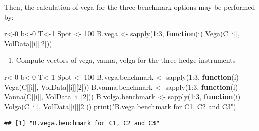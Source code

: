 \documentclass[
]{article}
\newenvironment{Shaded}{\begin{snugshade}}{\end{snugshade}}
\newcommand{\ControlFlowTok}[1]{\textcolor[rgb]{0.13,0.29,0.53}{\textbf{#1}}}
\newcommand{\DecValTok}[1]{\textcolor[rgb]{0.00,0.00,0.81}{#1}}
\newcommand{\FunctionTok}[1]{\textcolor[rgb]{0.00,0.00,0.00}{#1}}
\newcommand{\NormalTok}[1]{#1}
\newcommand{\OtherTok}[1]{\textcolor[rgb]{0.56,0.35,0.01}{#1}}
\newcommand{\SpecialCharTok}[1]{\textcolor[rgb]{0.00,0.00,0.00}{#1}}
\newcommand{\StringTok}[1]{\textcolor[rgb]{0.31,0.60,0.02}{#1}}
\providecommand{\tightlist}{%
  \setlength{\itemsep}{0pt}\setlength{\parskip}{0pt}}
\begin{document}
Then, the calculation of vega for the three benchmark options may be
performed by:

\begin{Shaded}
\begin{Highlighting}[]
\NormalTok{r}\OtherTok{\textless{}{-}}\DecValTok{0}
\NormalTok{b}\OtherTok{\textless{}{-}}\DecValTok{0}
\NormalTok{T}\OtherTok{\textless{}{-}}\DecValTok{1}
\NormalTok{Spot }\OtherTok{\textless{}{-}} \DecValTok{100}
\NormalTok{B.vega }\OtherTok{\textless{}{-}} \FunctionTok{sapply}\NormalTok{(}\DecValTok{1}\SpecialCharTok{:}\DecValTok{3}\NormalTok{, }\ControlFlowTok{function}\NormalTok{(i) }\FunctionTok{Vega}\NormalTok{(C[[i]], VolData[[i]][}\DecValTok{2}\NormalTok{]))}
\end{Highlighting}
\end{Shaded}

\begin{enumerate}
\def\labelenumi{\arabic{enumi}.}
\setcounter{enumi}{1}
\tightlist
\item
  Compute vectors of vega, vanna, volga for the three hedge instruments
\end{enumerate}

\begin{Shaded}
\begin{Highlighting}[]
\NormalTok{r}\OtherTok{\textless{}{-}}\DecValTok{0}
\NormalTok{b}\OtherTok{\textless{}{-}}\DecValTok{0}
\NormalTok{T}\OtherTok{\textless{}{-}}\DecValTok{1}
\NormalTok{Spot }\OtherTok{\textless{}{-}} \DecValTok{100}
\NormalTok{B.vega.benchmark }\OtherTok{\textless{}{-}} \FunctionTok{sapply}\NormalTok{(}\DecValTok{1}\SpecialCharTok{:}\DecValTok{3}\NormalTok{, }\ControlFlowTok{function}\NormalTok{(i) }\FunctionTok{Vega}\NormalTok{(C[[i]], VolData[[i]][}\DecValTok{2}\NormalTok{]))}
\NormalTok{B.vanna.benchmark }\OtherTok{\textless{}{-}} \FunctionTok{sapply}\NormalTok{(}\DecValTok{1}\SpecialCharTok{:}\DecValTok{3}\NormalTok{, }\ControlFlowTok{function}\NormalTok{(i) }\FunctionTok{Vanna}\NormalTok{(C[[i]], VolData[[i]][}\DecValTok{2}\NormalTok{]))}
\NormalTok{B.volga.benchmark }\OtherTok{\textless{}{-}} \FunctionTok{sapply}\NormalTok{(}\DecValTok{1}\SpecialCharTok{:}\DecValTok{3}\NormalTok{, }\ControlFlowTok{function}\NormalTok{(i) }\FunctionTok{Volga}\NormalTok{(C[[i]], VolData[[i]][}\DecValTok{2}\NormalTok{]))}
\FunctionTok{print}\NormalTok{(}\StringTok{"B.vega.benchmark for C1, C2 and C3"}\NormalTok{)}
\end{Highlighting}
\end{Shaded}

\begin{verbatim}
## [1] "B.vega.benchmark for C1, C2 and C3"
\end{verbatim}
\end{document}
